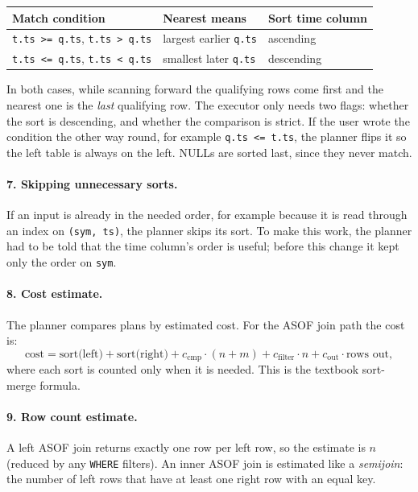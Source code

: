 \documentclass[11pt,a4paper]{article}
\newcommand{\code}[1]{\texttt{#1}}
\begin{document}
\begin{center}
\begin{tabular}{@{}lll@{}}
\toprule
Match condition & Nearest means & Sort time column \\
\midrule
\code{t.ts >= q.ts}, \code{t.ts > q.ts} & largest earlier \code{q.ts} & ascending \\
\code{t.ts <= q.ts}, \code{t.ts < q.ts} & smallest later \code{q.ts} & descending \\
\bottomrule
\end{tabular}
\end{center}

In both cases, while scanning forward the qualifying rows come first and the nearest one
is the \emph{last} qualifying row. The executor only needs two flags: whether the sort is
descending, and whether the comparison is strict. If the user wrote the condition the
other way round, for example \code{q.ts <= t.ts}, the planner flips it so the left table
is always on the left. NULLs are sorted last, since they never match.

\paragraph{7. Skipping unnecessary sorts.}
If an input is already in the needed order, for example because it is read through an
index on \code{(sym, ts)}, the planner skips its sort. To make this work, the planner had
to be told that the time column's order is useful; before this change it kept only the
order on \code{sym}.

\paragraph{8. Cost estimate.}
The planner compares plans by estimated cost. For the ASOF join path the cost is:
\[
  \text{cost} = \text{sort(left)} + \text{sort(right)}
   + c_{\text{cmp}} \cdot (n + m) + c_{\text{filter}} \cdot n
   + c_{\text{out}} \cdot \text{rows out},
\]
where each sort is counted only when it is needed. This is the textbook sort-merge
formula.

\paragraph{9. Row count estimate.}
A left ASOF join returns exactly one row per left row, so the estimate is $n$ (reduced by
any \code{WHERE} filters). An inner ASOF join is estimated like a \emph{semijoin}: the
number of left rows that have at least one right row with an equal key.
\end{document}
